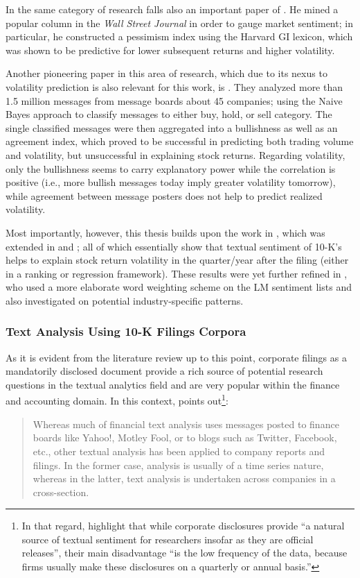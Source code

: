 In the same category of research falls also an important paper of \textcite{Tetlock2007}. He mined a popular column in the \textit{Wall Street Journal} in order to gauge market sentiment; in particular, he constructed a pessimism index using the Harvard GI lexicon, which was shown to be predictive for lower subsequent returns and higher volatility.

Another pioneering paper in this area of research, which due to its nexus to volatility prediction is also relevant for this work, is \textcite{AntweilerFrank2004}. They analyzed more than 1.5 million messages from message boards about 45 companies; using the Naive Bayes approach to classify messages to either buy, hold, or sell category. The single classified messages were then aggregated into a bullishness as well as an agreement index, which proved to be successful in predicting both trading volume and volatility, but unsuccessful in explaining stock returns. Regarding volatility, only the bullishness seems to carry explanatory power while the correlation is positive (i.e., more bullish messages today imply greater volatility tomorrow), while agreement between message posters does not help to predict realized volatility. 

Most importantly, however, this thesis builds upon the work in \textcite{Kogan2009_1}, which was extended in \textcite{TsaiWang2012, TsaiWang2013, TsaiWang2014, TsaiWangChien2016, WangTsaiLiuChang2013} and \textcite{TsaiWang2016}; all of which essentially show that textual sentiment of 10-K's helps to explain stock return volatility in the quarter/year after the filing (either in a ranking or regression framework). These results were yet further refined in \textcite{Rekabsaz2017}, who used a more elaborate word weighting scheme on the LM sentiment lists and also investigated on potential industry-specific patterns. 

\subsubsection{Text Analysis Using 10-K Filings Corpora}
\label{sssec: lit_rev_mining_10K}

As it is evident from the literature review up to this point, corporate filings as a mandatorily disclosed document provide a rich source of potential research questions in the textual analytics field and are very popular within the finance and accounting domain. In this context, \textcite[223]{Das2014} points out\footnote{In that regard, \textcite[3]{KearneyLiu2014} highlight that while corporate disclosures provide \enquote{a natural source of textual sentiment for researchers insofar as they are official releases}, their main disadvantage \enquote{is the low frequency of the data, because firms usually make these disclosures on a quarterly or annual basis.}}: 
\blockquote{Whereas much of financial text analysis uses messages posted to finance boards like Yahoo!, Motley Fool, or to blogs such as Twitter, Facebook, etc., other textual analysis has been applied to company reports and filings. In the former case, analysis is usually of a time series nature, whereas in the latter, text analysis is undertaken across companies in a cross-section.}

